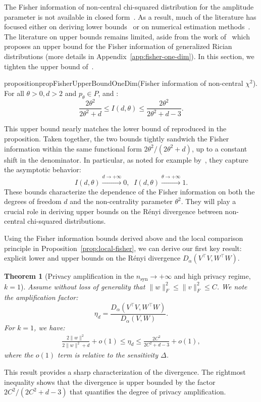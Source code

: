 \documentclass{article}
\theoremstyle{plain}
\newtheorem{theorem}{Theorem}[section]
\theoremstyle{definition}
\theoremstyle{remark}
\begin{document}
The Fisher information of non-central chi-squared distribution for the amplitude parameter is not available in closed form~\citep{Idier2014}. As a result, much of the literature has focused either on deriving lower bounds~\citep{Bouhrara2018, Idier2014, Stein2016} or on numerical estimation methods~\citep{Bouhrara2018}. The literature on upper bounds remains limited, aside from the work of~\citet{Idier2014} which proposes an upper bound for the Fisher information of generalized Rician distributions (more details in Appendix~\ref{app:fisher-one-dim}). In this section, we tighten the upper bound of~\citet{Idier2014}.



\begin{restatable}{proposition}{propFisherUpperBoundOneDim}\normalfont(Fisher information of non-central $\chi^2$).
\label{prop:Fisher-upper-bound-one-dim}
For all $\theta> 0, d > 2$ and  $p_\theta \in P$, and :
    \[\frac{2\theta^2}{2\theta^2 + d} \leq I(d,\theta) \leq \frac{2\theta^2}{2\theta^2 + d-3}.\]
\end{restatable}

This upper bound nearly matches the lower bound of \citet{Idier2014} reproduced in the proposition. Taken together, the two bounds tightly sandwich the Fisher information within the same functional form $2\theta^2/(2\theta^2 + d)$, up to a constant shift in the denominator. In particular, as noted for example by~\citet{Idier2014}, they capture the asymptotic behavior: \[I(d,\theta) \overset{d\to + \infty}{\longrightarrow} 0,\;\; I(d,\theta) \overset{\theta\to + \infty}{\longrightarrow} 1.\]
These bounds characterize the dependence of the Fisher information on both the degrees of freedom $d$ and the non-centrality parameter $\theta^2$. They will play a crucial role in deriving upper bounds on the Rényi divergence between non-central chi-squared distributions.


Using the Fisher information bounds derived above and the local comparison principle in Proposition~\ref{prop:local-fisher}, we can derive our first key result: explicit lower and upper bounds on the Rényi divergence $D_\alpha(V^\top V, W^\top W)$.

\begin{theorem}[Privacy amplification in the $n_{\mathrm{syn}} \to + \infty$ and %
high privacy regime, $k=1$]
\label{thm:local-renyi}
    Assume without loss of generality that $\|w\|_F^2 \leq \|v\|_F^2 \leq C$. 
    We note the amplification factor:
    \[\eta_d = \frac{D_\alpha(V^\top V,W^\top W)}{D_\alpha(V,W)}.\]
    For $k=1$, we have:
    \begin{align*}
       \frac{2\|w\|^2}{2\|w\|^2 + d} + o(1) \leq \eta_d \leq \frac{2C^2}{2C^2 + d-3} + o(1),
    \end{align*}
    where the $o(1)$ term is relative to the sensitivity $\Delta$.
\end{theorem}
This result provides a sharp characterization of the divergence. The rightmost inequality shows that the divergence is upper bounded by the factor $2C^2/(2C^2 + d-3)$ that quantifies the degree of privacy amplification.
\end{document}
